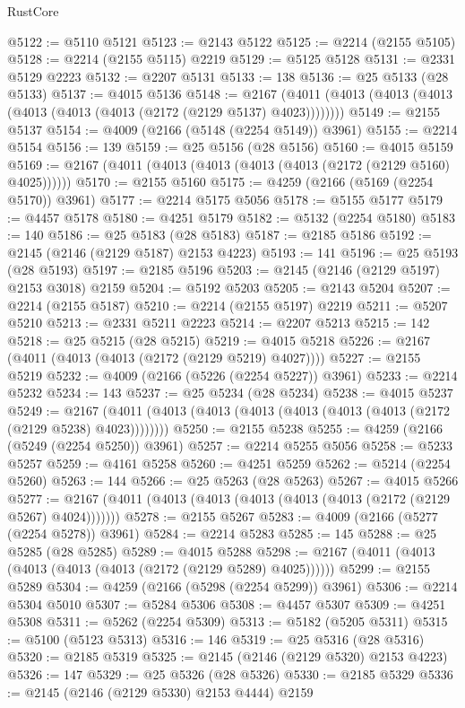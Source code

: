 \begin{lexlean}{RustCore}
\begin{coremodule}
@5122 := @5110 @5121
@5123 := @2143 @5122
@5125 := @2214 (@2155 @5105)
@5128 := @2214 (@2155 @5115) @2219
@5129 := @5125 @5128
@5131 := @2331 @5129 @2223
@5132 := @2207 @5131
@5133 := 138
@5136 := @25 @5133 (@28 @5133)
@5137 := @4015 @5136
@5148 := @2167 (@4011 (@4013 (@4013 (@4013 (@4013 (@4013 (@4013 (@2172 (@2129 @5137) @4023))))))))
@5149 := @2155 @5137
@5154 := @4009 (@2166 (@5148 (@2254 @5149)) @3961)
@5155 := @2214 @5154
@5156 := 139
@5159 := @25 @5156 (@28 @5156)
@5160 := @4015 @5159
@5169 := @2167 (@4011 (@4013 (@4013 (@4013 (@4013 (@2172 (@2129 @5160) @4025))))))
@5170 := @2155 @5160
@5175 := @4259 (@2166 (@5169 (@2254 @5170)) @3961)
@5177 := @2214 @5175 @5056
@5178 := @5155 @5177
@5179 := @4457 @5178
@5180 := @4251 @5179
@5182 := @5132 (@2254 @5180)
@5183 := 140
@5186 := @25 @5183 (@28 @5183)
@5187 := @2185 @5186
@5192 := @2145 (@2146 (@2129 @5187) @2153 @4223)
@5193 := 141
@5196 := @25 @5193 (@28 @5193)
@5197 := @2185 @5196
@5203 := @2145 (@2146 (@2129 @5197) @2153 @3018) @2159
@5204 := @5192 @5203
@5205 := @2143 @5204
@5207 := @2214 (@2155 @5187)
@5210 := @2214 (@2155 @5197) @2219
@5211 := @5207 @5210
@5213 := @2331 @5211 @2223
@5214 := @2207 @5213
@5215 := 142
@5218 := @25 @5215 (@28 @5215)
@5219 := @4015 @5218
@5226 := @2167 (@4011 (@4013 (@4013 (@2172 (@2129 @5219) @4027))))
@5227 := @2155 @5219
@5232 := @4009 (@2166 (@5226 (@2254 @5227)) @3961)
@5233 := @2214 @5232
@5234 := 143
@5237 := @25 @5234 (@28 @5234)
@5238 := @4015 @5237
@5249 := @2167 (@4011 (@4013 (@4013 (@4013 (@4013 (@4013 (@4013 (@2172 (@2129 @5238) @4023))))))))
@5250 := @2155 @5238
@5255 := @4259 (@2166 (@5249 (@2254 @5250)) @3961)
@5257 := @2214 @5255 @5056
@5258 := @5233 @5257
@5259 := @4161 @5258
@5260 := @4251 @5259
@5262 := @5214 (@2254 @5260)
@5263 := 144
@5266 := @25 @5263 (@28 @5263)
@5267 := @4015 @5266
@5277 := @2167 (@4011 (@4013 (@4013 (@4013 (@4013 (@4013 (@2172 (@2129 @5267) @4024)))))))
@5278 := @2155 @5267
@5283 := @4009 (@2166 (@5277 (@2254 @5278)) @3961)
@5284 := @2214 @5283
@5285 := 145
@5288 := @25 @5285 (@28 @5285)
@5289 := @4015 @5288
@5298 := @2167 (@4011 (@4013 (@4013 (@4013 (@4013 (@2172 (@2129 @5289) @4025))))))
@5299 := @2155 @5289
@5304 := @4259 (@2166 (@5298 (@2254 @5299)) @3961)
@5306 := @2214 @5304 @5010
@5307 := @5284 @5306
@5308 := @4457 @5307
@5309 := @4251 @5308
@5311 := @5262 (@2254 @5309)
@5313 := @5182 (@5205 @5311)
@5315 := @5100 (@5123 @5313)
@5316 := 146
@5319 := @25 @5316 (@28 @5316)
@5320 := @2185 @5319
@5325 := @2145 (@2146 (@2129 @5320) @2153 @4223)
@5326 := 147
@5329 := @25 @5326 (@28 @5326)
@5330 := @2185 @5329
@5336 := @2145 (@2146 (@2129 @5330) @2153 @4444) @2159

\end{coremodule}
\end{lexlean}
